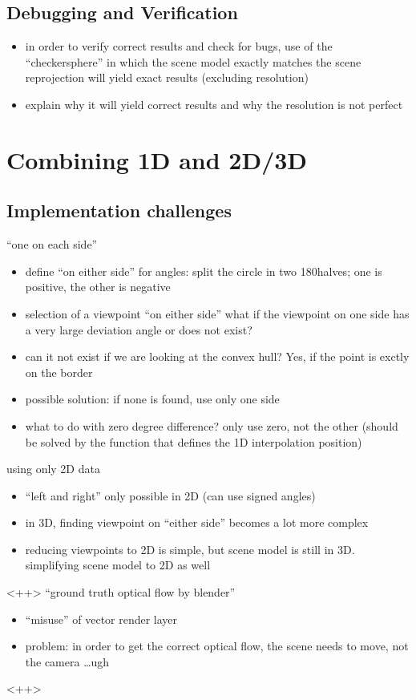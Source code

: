 \subsection{Debugging and Verification}
\begin{itemize}
  \item in order to verify correct results and check for bugs, use of the ``checkersphere'' in which the scene model exactly matches the scene \ar reprojection will yield exact results (excluding resolution)
  \item explain why it will yield correct results and why the resolution is not perfect
\end{itemize}

\section{Combining 1D and 2D/3D}
\subsection{Implementation challenges}
``one on each side''
\begin{itemize}
  \item define ``on either side'' for angles: split the circle in two 180\degree halves; one is positive, the other is negative
  \item selection of a viewpoint ``on either side'' \ar what if the viewpoint on one side has a very large deviation angle or does not exist?
  \item can it not exist if we are looking at the convex hull? Yes, if the point is exctly on the border
  \item possible solution: if none is found, use only one side
  \item what to do with zero degree difference? \ar only use zero, not the other (should be solved by the function that defines the 1D interpolation position)
\end{itemize}
using only 2D data
\begin{itemize}
  \item ``left and right'' only possible in 2D (can use signed angles)
  \item in 3D, finding viewpoint on ``either side'' becomes a lot more complex
  \item reducing viewpoints to 2D is simple, but scene model is still in 3D. simplifying scene model to 2D as well
\end{itemize}<++>
``ground truth optical flow by blender''
\begin{itemize}
  \item ``misuse'' of vector render layer
  \item problem: in order to get the correct optical flow, the scene needs to move, not the camera \ldots ugh
\end{itemize}<++>
